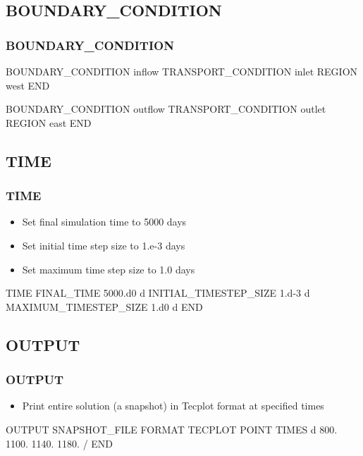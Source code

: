 \documentclass{beamer}
\begin{document}
\subsection{BOUNDARY\_CONDITION}

\begin{frame}\frametitle{BOUNDARY\_CONDITION}

\small
\begin{semiverbatim}
BOUNDARY_CONDITION inflow
  TRANSPORT_CONDITION inlet
  REGION west
END

BOUNDARY_CONDITION outflow
  TRANSPORT_CONDITION outlet
  REGION east
END

\end{semiverbatim}

\end{frame}

\subsection{TIME}

\begin{frame}[fragile]\frametitle{TIME}

\begin{itemize}
\item Set final simulation time to 5000 days
\item Set initial time step size to 1.e-3 days
\item Set maximum time step size to 1.0 days
\end{itemize}


\begin{semiverbatim}

TIME
  FINAL_TIME 5000.d0 d
  INITIAL_TIMESTEP_SIZE 1.d-3 d
  MAXIMUM_TIMESTEP_SIZE 1.d0 d
END
\end{semiverbatim}

\end{frame}

\subsection{OUTPUT}

\begin{frame}[fragile]\frametitle{OUTPUT}

\begin{itemize}
\item Print entire solution (a snapshot) in Tecplot format at specified times

\end{itemize}

\begin{semiverbatim}\small

OUTPUT
  SNAPSHOT_FILE
    FORMAT TECPLOT POINT
    TIMES d 800. 1100. 1140. 1180. 
  /
END

\end{semiverbatim}

\end{frame}
\end{document}
